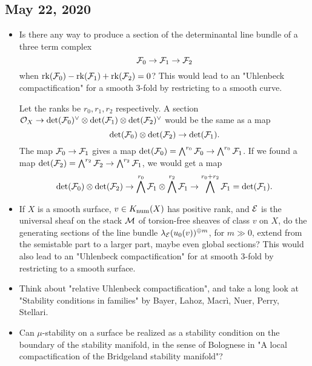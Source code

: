 \documentclass[letterpaper,10pt]{article}
\begin{document}
\subsection*{May 22, 2020}
\begin{itemize}
    \item Is there any way to produce a section of the determinantal line bundle of a three term complex
    \[ \mathcal{F}_0 \to \mathcal{F}_1 \to \mathcal{F}_2 \]
    when $\operatorname{\mathrm{rk}}(\mathcal{F}_0) - \operatorname{\mathrm{rk}}(\mathcal{F}_1) + \operatorname{\mathrm{rk}}(\mathcal{F}_2) = 0$?
    This would lead to an "Uhlenbeck compactification" for a smooth 3-fold by restricting to a smooth curve.
    
    Let the ranks be $r_0, r_1, r_2$ respectively. A section $\mathcal{O}_X \to \det(\mathcal{F}_0)^{\vee} \otimes \det(\mathcal{F}_1) \otimes \det(\mathcal{F}_2)^\vee$ would be the same as a map
    \[ \det(\mathcal{F}_0) \otimes \det(\mathcal{F}_2) \to \det(\mathcal{F}_1). \]
    The map $\mathcal{F}_0 \to \mathcal{F}_1$ gives a map $\det(\mathcal{F}_0) = \bigwedge^{r_0} \mathcal{F}_0 \to \bigwedge^{r_0} \mathcal{F}_1$. If we found a map $\det(\mathcal{F}_2) = \bigwedge^{r_2} \mathcal{F}_2 \to \bigwedge^{r_2} \mathcal{F}_1$, we would get a map
    \[ \det(\mathcal{F}_0) \otimes \det(\mathcal{F}_2) \to \bigwedge^{r_0} \mathcal{F}_1 \otimes \bigwedge^{r_2} \mathcal{F}_1 \to \bigwedge^{r_0 + r_2} \mathcal{F}_1 = \det(\mathcal{F}_1). \]
    
    \item If $X$ is a smooth surface, $v \in K_{\mathrm{num}}(X)$ has positive rank, and $\mathcal{E}$ is the universal sheaf on the stack $\mathcal{M}$ of torsion-free sheaves of class $v$ on $X$, do the generating sections of the line bundle $\lambda_{\mathcal{E}}(u_0(v))^{\oplus m}$, for $m \gg 0$, extend from the semistable part to a larger part, maybe even global sections? This would also lead to an "Uhlenbeck compactification" for at smooth 3-fold by restricting to a smooth surface.
    
    \item Think about "relative Uhlenbeck compactification", and take a long look at "Stability conditions in families" by Bayer, Lahoz, Macr\`i, Nuer, Perry, Stellari.
    
    \item Can $\mu$-stability on a surface be realized as a stability condition on the boundary of the stability manifold, in the sense of Bolognese in "A local compactification of the Bridgeland stability manifold"?
\end{itemize}
\end{document}
